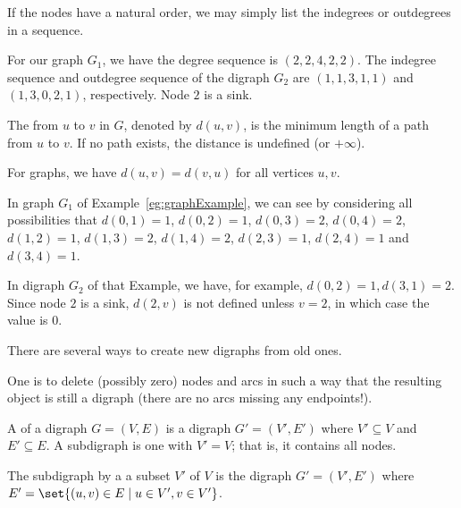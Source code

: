 If the nodes have a natural order, we may simply list the indegrees or
outdegrees in a sequence.

\begin{Example}
For our graph $G_1$, we have the degree sequence is $(2, 2, 4, 2, 2)$.
The indegree sequence and outdegree sequence of the digraph $G_2$ are
$(1,1,3,1,1)$ and $(1,3,0,2,1)$, respectively. Node $2$ is a sink.
\end{Example}

\begin{Definition}
The  from $u$ to $v$ in $G$, denoted by $d(u,v)$, is the 
minimum length of a path from $u$ to $v$. If no path exists, the distance is 
undefined (or $+\infty$).
\end{Definition}

For graphs, we have $d(u,v) = d(v,u)$ for all vertices $u, v$. 

\begin{Example}
In graph $G_1$ of Example~\ref{eg:graphExample}, we can see by considering
all possibilities that $d(0, 1) = 1$, $d(0, 2) = 1$, $d(0, 3) = 2$,
$d(0, 4) = 2$, $d(1, 2) = 1$, $d(1, 3) = 2$, $d(1, 4) = 2$, $d(2, 3) =
1$, $d(2, 4) = 1$ and $d(3, 4) = 1$.

In digraph $G_2$ of that Example, we have, for example, $d(0, 2) = 1, 
d(3, 1) = 2$. Since node $2$ is a sink, $d(2, v)$ is not defined 
unless $v = 2$, in which case the value is $0$.
\end{Example}

There are several ways to create new digraphs from old ones.

One is to delete (possibly zero) nodes and arcs in such a way that the 
resulting object is still a digraph (there are no arcs missing any
endpoints!).

\begin{Definition}
A  of a digraph $G = (V, E)$ is a digraph $G' = (V',
E')$ where $V'\subseteq V$ and $E'\subseteq E$. A 
subdigraph is one with $V'=V$; that is, it contains all nodes.

\end{Definition}

\begin{Example}

\end{Example}

\begin{Definition}
The subdigraph  by a a subset $V'$ of $V$ is the 
digraph $G' = (V', E')$ where $E' = \set{(u, v) \in E \mid u \in V', v\in V'}$.
\end{Definition}

